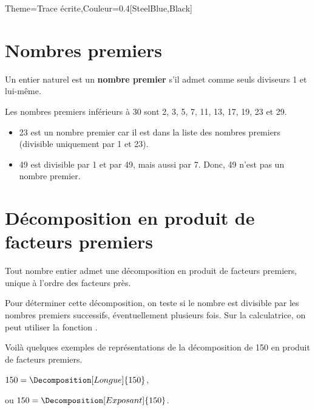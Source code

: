 \begin{Maquette}[Cours]{Theme={Trace écrite},Couleur={0.4[SteelBlue,Black]}}

\section{Nombres premiers}

   \begin{definition*}{}
      Un entier naturel est un \textbf{nombre premier} s'il admet comme seuls diviseurs 1 et lui-même.
   \end{definition*}

   \begin{propriete*}{}
      Les nombres premiers inférieurs à 30 sont 2, 3, 5, 7, 11, 13, 17, 19, 23 et 29.
   \end{propriete*}

   \begin{exemple*}{}
      \begin{itemize}
         \item 23 est un nombre premier car il est dans la liste des nombres premiers (divisible uniquement par 1 et 23).
         \item 49 est divisible par 1 et par 49, mais aussi par 7. Donc, 49 n'est pas un nombre premier.
      \end{itemize}
   \end{exemple*}


\section{Décomposition en produit de facteurs premiers}

   \begin{propriete*}{}
      Tout nombre entier admet une décomposition en produit de facteurs premiers, unique à l'ordre des facteurs près. 
   \end{propriete*}

   Pour déterminer cette décomposition, on teste si le nombre est divisible par les nombres premiers successifs, éventuellement plusieurs fois. Sur la calculatrice, on peut utiliser la fonction  \fg.

   \begin{exemple*}{}
      Voilà quelques exemples de représentations de la décomposition de 150 en produit de facteurs premiers. \par \bigskip
      \quad
      \begin{minipage}{2.5cm}
      \end{minipage}
      \quad
      \begin{minipage}{7.5cm}
         \qquad\;
      \end{minipage}
      \quad
      \begin{minipage}{3cm}
         $150 =\Decomposition[Longue]{150}$, \par
         ou $150 =\Decomposition[Exposant]{150}$.
      \end{minipage}
   \end{exemple*}



\end{Maquette}
